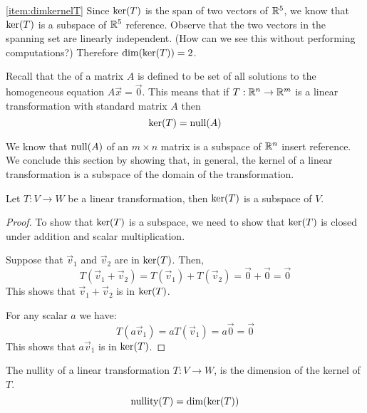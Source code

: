 \documentclass{ximera}
\begin{document}
\begin{example}
\begin{explanation}
\ref{item:dimkernelT}  Since $\textnormal{ker}(T)$ is the span of two vectors of $\mathbb{R}^5$, we know that $\textnormal{ker}(T)$ is a subspace of $\mathbb{R}^5$ {\color{red} reference}.  Observe that the two vectors in the spanning set are linearly independent. (How can we see this without performing computations?)  Therefore $\textnormal{dim}(\textnormal{ker}(T))=2$.
\end{explanation}
\end{example}

\begin{general}
Recall that the  of a matrix $A$ is defined to be set of all solutions to the homogeneous equation $A\vec{x}=\vec{0}$. This means that  if $T:\mathbb{R}^n\rightarrow \mathbb{R}^m$ is a linear transformation with standard matrix $A$ then
$$\textnormal{ker}(T)=\textnormal{null}(A)$$
\end{general}
We know that $\textnormal{null}(A)$ of an $m\times n$ matrix is a subspace of $\mathbb{R}^n$ {\color{red} insert reference}.  We conclude this section by showing that, in general, the kernel of a linear transformation is a subspace of the domain of the transformation.
\begin{theorem}\label{th:kersubspace} Let $T:V\rightarrow W$ be a linear transformation, then $\textnormal{ker}(T)$ is a subspace of $V$.
\end{theorem}
\begin{proof}
To show that $\textnormal{ker}(T)$ is a subspace, we need to show that $\textnormal{ker}(T)$ is closed under addition and scalar multiplication.

Suppose that $\vec{v}_1$ and $\vec{v}_2$ are in $\textnormal{ker}(T)$.  Then,
$$T(\vec{v}_1+\vec{v}_2)=T(\vec{v}_1)+T(\vec{v}_2)=\vec{0}+\vec{0}=\vec{0}$$
This shows that $\vec{v}_1+\vec{v}_2$ is in $\textnormal{ker}(T)$.

For any scalar $a$ we have:
$$T(a\vec{v}_1)=aT(\vec{v}_1)=a\vec{0}=\vec{0}$$
This shows that $a\vec{v}_1$ is in $\textnormal{ker}(T)$.

\end{proof}



\begin{definition}\label{def:nullityT}
The nullity of a linear transformation $T:V\rightarrow W$, is the dimension of the kernel of $T$.
$$\textnormal{nullity}(T)=\textnormal{dim}(\textnormal{ker}(T))$$
\end{definition}
\end{document}
